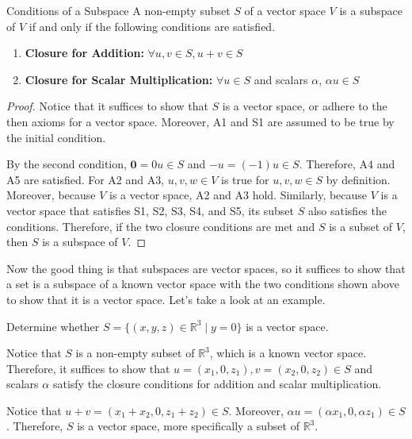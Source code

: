 \documentclass[../main.tex]{subfiles}
\begin{document}
\begin{theorem}{Conditions of a Subspace}
A non-empty subset $S$ of a vector space $V$ is a subspace of $V$ if
and only if the following conditions are satisfied.
\begin{enumerate}[noitemsep]
\item
\textbf{Closure for Addition: }
$\forall u, v \in S, u + v \in S$
\item
\textbf{Closure for Scalar Multiplication: }
$\forall u \in S$ and scalars $\alpha$, $\alpha u \in S$
\end{enumerate}
\end{theorem}
\begin{proof}
Notice that it suffices to show that $S$ is a vector space, or adhere
to the then axioms for a vector space. Moreover, A1 and S1 are assumed
to be true by the initial condition.

By the second condition, $\mathbf{0} = 0 u \in S$ and $-u = (-1) u
\in S$. Therefore, A4 and A5 are satisfied. For A2 and A3, $u, v, w
\in V$ is true for $u, v, w \in S$ by definition. Moreover, because
$V$ is a vector space, A2 and A3 hold. Similarly, because $V$ is a
vector space that satisfies S1, S2, S3, S4, and S5, its subset $S$
also satisfies the conditions. Therefore, if the two closure
conditions are met and $S$ is a subset of $V$, then $S$ is a subspace
of $V$.
\end{proof}

Now the good thing is that subspaces are vector spaces, so it suffices
to show that a set is a subspace of a known vector space with the two
conditions shown above to show that it is a vector space. Let's take
a look at an example.

\begin{problem}
Determine whether $S = \{ (x, y, z) \in \mathbb{R}^3 \mid y = 0 \}$
is a vector space.
\end{problem}
\begin{solution}
Notice that $S$ is a non-empty subset of $\mathbb{R}^3$, which is a
known vector space. Therefore, it suffices to show that $u =
(x_1, 0, z_1), v = (x_2, 0, z_2) \in S$ and scalars $\alpha$ satisfy
the closure conditions for addition and scalar multiplication.

Notice that $u + v = (x_1 + x_2, 0, z_1 + z_2) \in S$. Moreover,
$\alpha u = (\alpha x_1, 0, \alpha z_1) \in S$. Therefore, $S$ is a
vector space, more specifically a subset of $\mathbb{R}^3$.
\end{solution}
\end{document}
